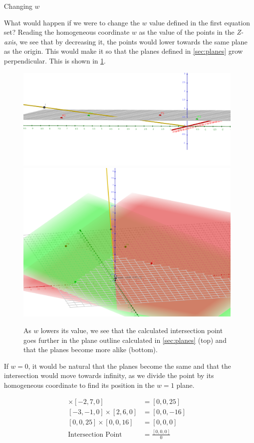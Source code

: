 \documentclass[twocolumn]{article}
\begin{document}
    \begin{section}{Changing $w$}

      What would happen if we were to change the $w$ value defined in the first
equation set? Reading the homogeneous coordinate $w$ as the value of the points
in the \textit{Z-axis}, we see that by decreasing it, the points would lower
towards the same plane as the origin. This would make it so that the planes
defined in \cref{sec:planes} grow perpendicular. This is shown in
\cref{fig:lower-w}.

      \begin{figure}
        \centering
        \includegraphics[width=0.85\linewidth]{./res/8.png}
        \includegraphics[width=0.85\linewidth]{./res/9.png}
        \caption{As $w$ lowers its value, we see that the calculated
intersection point goes further in the plane outline calculated in
\cref{sec:planes} (top) and that the planes become more alike (bottom).}
        \label{fig:lower-w}
      \end{figure}

    If $w = 0$, it would be natural that the planes become the same and that the
intersection would move towards infinity, as we divide the point by its
homogeneous coordinate to find its position in the $w = 1$ plane.

    \begin{align*}
      [3, 2, 0] \times [-2, 7, 0] &= [0, 0, 25] \\
      [-3, -1, 0] \times [2, 6, 0] &= [0, 0, -16] \\
      [0, 0, 25] \times [0, 0, 16] &= [0, 0, 0] \\
      \text{Intersection Point} &= \frac{[0, 0, 0]}{0}
    \end{align*}
    \end{section}
\end{document}
